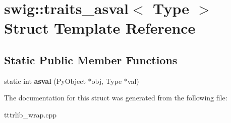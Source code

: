 \hypertarget{structswig_1_1traits__asval}{}\section{swig\+:\+:traits\+\_\+asval$<$ Type $>$ Struct Template Reference}
\label{structswig_1_1traits__asval}
\subsection*{Static Public Member Functions}
\begin{DoxyCompactItemize}
\item 
\mbox{\label{structswig_1_1traits__asval_a5d0ee3dd0c23458db2aeae93d8c02bc0}} 
static int {\bfseries asval} (Py\+Object $\ast$obj, Type $\ast$val)
\end{DoxyCompactItemize}


The documentation for this struct was generated from the following file\+:\begin{DoxyCompactItemize}
\item 
tttrlib\+\_\+wrap.\+cpp\end{DoxyCompactItemize}
